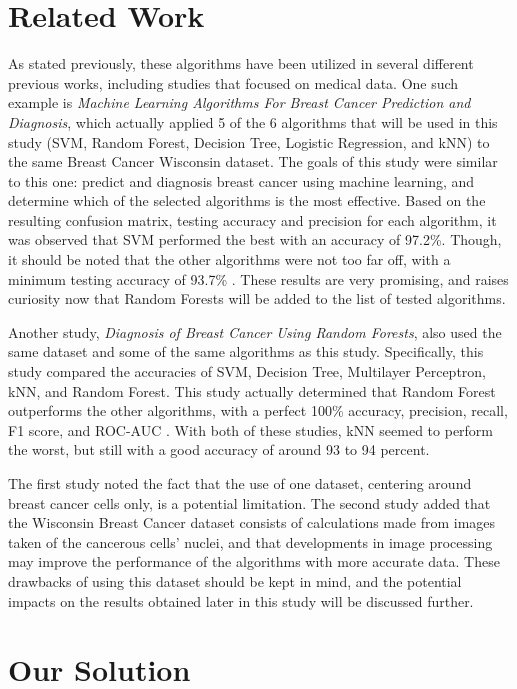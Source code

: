 \documentclass[conference]{IEEEtran}
\begin{document}
\section{Related Work}
As stated previously, these algorithms have been utilized in several different previous works, including studies that focused on medical data. One such example is \textit{Machine Learning Algorithms For Breast Cancer Prediction and Diagnosis}, which actually applied 5 of the 6 algorithms that will be used in this study (SVM, Random Forest, Decision Tree, Logistic Regression, and kNN) to the same Breast Cancer Wisconsin dataset. The goals of this study were similar to this one: predict and diagnosis breast cancer using machine learning, and determine which of the selected algorithms is the most effective. Based on the resulting confusion matrix, testing accuracy and precision for each algorithm, it was observed that SVM performed the best with an accuracy of 97.2\%. Though, it should be noted that the other algorithms were not too far off, with a minimum testing accuracy of 93.7\% \cite{NAJI2021487}. These results are very promising, and raises curiosity now that Random Forests will be added to the list of tested algorithms.

Another study, \textit{Diagnosis of Breast Cancer Using Random Forests}, also used the same dataset and some of the same algorithms as this study. Specifically, this study compared the accuracies of SVM, Decision Tree, Multilayer Perceptron, kNN, and Random Forest. This study actually determined that Random Forest outperforms the other algorithms, with a perfect 100\% accuracy, precision, recall, F1 score, and ROC-AUC \cite{MINNOOR2023429}. With both of these studies, kNN seemed to perform the worst, but still with a good accuracy of around 93 to 94 percent.

The first study noted the fact that the use of one dataset, centering around breast cancer cells only, is a potential limitation. The second study added that the Wisconsin Breast Cancer dataset consists of calculations made from images taken of the cancerous cells' nuclei, and that developments in image processing may improve the performance of the algorithms with more accurate data. These drawbacks of using this dataset should be kept in mind, and the potential impacts on the results obtained later in this study will be discussed further.

\section{Our Solution}
\end{document}
